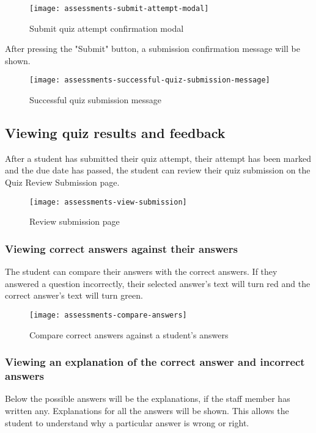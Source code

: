 \begin{figure}[h!]
	\centering
	\texttt{[image: assessments-submit-attempt-modal]}
	\caption{Submit quiz attempt confirmation modal}
\end{figure}

After pressing the "Submit" button, a submission confirmation message will be shown.

\begin{figure}[h!]
	\centering
	\texttt{[image: assessments-successful-quiz-submission-message]}
	\caption{Successful quiz submission message}
\end{figure}


\subsection{Viewing quiz results and feedback}
After a student has submitted their quiz attempt, their attempt has been marked and the due date has passed, the student can review their quiz submission on the Quiz Review Submission page.

\begin{figure}[h!]
	\centering
	\texttt{[image: assessments-view-submission]}
	\caption{Review submission page}
\end{figure}

\subsubsection{Viewing correct answers against their answers}
The student can compare their answers with the correct answers. If they answered a question incorrectly, their selected answer's text will turn red and the correct answer's text will turn green.

\begin{figure}[h!]
	\centering
	\texttt{[image: assessments-compare-answers]}
	\caption{Compare correct answers against a student's answers}
\end{figure}


\subsubsection{Viewing an explanation of the correct answer and incorrect answers}
Below the possible answers will be the explanations, if the staff member has written any. Explanations for all the answers will be shown. This allows the student to understand why a particular answer is wrong or right.

